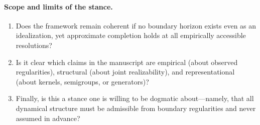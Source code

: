 \documentclass[11pt]{article}
\begin{document}
\paragraph{Scope and limits of the stance.}
\begin{enumerate}
  \item Does the framework remain coherent if no boundary horizon exists even as an idealization,
  yet approximate completion holds at all empirically accessible resolutions?

  \item Is it clear which claims in the manuscript are empirical (about observed regularities),
  structural (about joint realizability), and representational (about kernels, semigroups, or
  generators)?

  \item Finally, is this a stance one is willing to be dogmatic about---namely, that all dynamical
  structure must be admissible from boundary regularities and never assumed in advance?
\end{enumerate}
\end{document}
